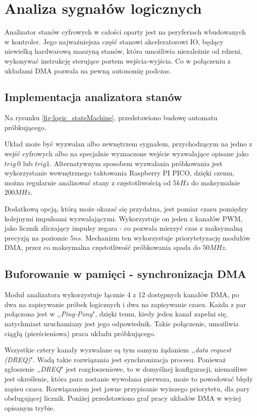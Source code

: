 \section{Analiza sygnałów logicznych}
    Analizator stanów cyfrowych w całości oparty jest na peryferiach wbudowanych w kontroler.
    Jego najważniejsza część stanowi akceleratorowi IO, będący niewielką hardwarową maszyną stanów, 
    która umożliwia niezależnie od rdzeni, wykonywać instrukcję sterujące portem wejścia-wyjścia.
    Co w połączeniu z układami DMA pozwala na pewną autonomię podczas.


\subsection{Implementacja analizatora stanów}
    Na rysunku \ref{fig:logic_stateMachine}, przedstawiono budowę automatu próbkującego.

    

    Układ może być wyzwalan albo zewnętrzem sygnałem, przychodzącym na jedno z wejść cyfrowych albo na specjalnie wyznaczone wejście wyzwalające opisane jako $trig\ 0$ lub $trig 1$.
    Alternatywnym sposobem wyzwalania próbkowania jest wykorzystanie wewnętrznego taktowania Raspberry PI PICO, dzięki czemu, można regularnie analizować stany z częstotliwością od $5kHz$ do maksymalnie $200MHz$.

    Dodatkową opcją, którą może okazać się przydatna, jest pomiar czasu pomiędzy kolejnymi impulsami wyzwalającymi.
    Wykorzystuje on jeden z kanałów PWM, jako licznik zliczający impulsy zegara - co pozwala mierzyć czas z maksymalną precyzją na poziomie $5ns$.
    Mechanizm ten wykorzystuje priorytetyzację modułów DMA, przez co maksymalna częstotliwość próbkowania spada do $50MHz$.


\subsection{Buforowanie w pamięci - synchronizacja DMA}
    Moduł analizatora wykorzystuje łącznie 4 z 12 dostępnych kanałów DMA, po dwa na zapisywanie próbek logicznych i dwa na zapisywanie czasu.
    Każda z par połączona jest w ,,\textit{Ping-Pong}", dzięki temu, kiedy jeden kanał zapełni się, natychmiast uruchamiany jest jego odpowiednik.
    Takie połączenie, umożliwia ciągłą (pierścieniowa) praca układu próbkującego.

    Wszystkie cztery kanały wyzwalane są tym samym żądaniem ,,\textit{data request (DREQ)}".
    Wadą takie rozwiązania jest synchronizacja procesu.
    Ponieważ zgłoszenie ,,\textit{DREQ}" jest rozgłoszeniowe, to w domyślnej konfiguracji, niemożliwe jest określenie, która para zostanie wywołana pierwsza, może to powodować błędy zapisu czasu.
    Rozwiązaniem jest jawne przypisanie wyższego priorytetu, dla pary obsługującej licznik.
    Poniżej przedstawiono graf pracy układów DMA w wyżej opisanym trybie.
    
    




